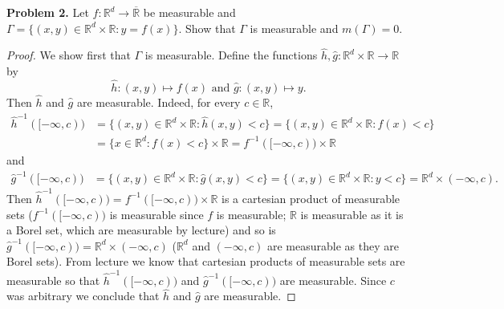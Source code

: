 \noindent \textbf{Problem 2.} Let \( f : \mathbb{R}^{d}  \to \overline{\mathbb{R}} \) be measurable and \( \Gamma = \{ (x,y) \in \mathbb{R}^{d} \times \mathbb{R} : y = f(x) \}  \). Show that \( \Gamma \) is measurable and \( m(\Gamma) = 0 \).
\begin{proof}
	We show first that \( \Gamma \) is measurable. Define the functions \( \hat{h}, \hat{g}  : \mathbb{R}^{d}  \times \mathbb{R} \to \mathbb{R} \) by \[\hat{h} : (x, y) \mapsto f(x) \mbox{ and } \hat{g} : (x,y) \mapsto y. \] Then \( \hat{h}  \) and \( \hat{g}  \) are measurable. Indeed, for every \( c \in \mathbb{R} \),
\begin{align*}
	\hat{h} ^{-1} ([-\infty, c)) &= \{ (x, y) \in \mathbb{R}^{d} \times \mathbb{R} : \hat{h} (x,y) < c \} = \{ (x,y) \in \mathbb{R}^{d} \times \mathbb{R} : f(x) < c \}\\ 
				     &= \{ x \in \mathbb{R}^{d} : f(x) < c \} \times \mathbb{R} = f ^{-1} ([-\infty,c)) \times \mathbb{R}
\end{align*}
and
\begin{align*}
	\hat{g} ^{-1} ([-\infty,c)) &= \{ (x,y) \in \mathbb{R}^{d} \times \mathbb{R} : \hat{g} (x,y) < c \} = \{ (x,y) \in \mathbb{R}^{d}  \times \mathbb{R} : y < c \} = \mathbb{R}^{d} \times (-\infty,c).
\end{align*}
Then \( \hat{h} ^{-1} ([-\infty,c))  = f ^{-1} ([-\infty,c)) \times \mathbb{R} \) is a cartesian product of measurable sets (\( f ^{-1} ([-\infty,c))  \) is measurable since \( f \) is measurable; \( \mathbb{R} \) is measurable as it is a Borel set, which are measurable by lecture) and so is \( \hat{g} ^{-1} ([-\infty,c)) = \mathbb{R}^{d}  \times (-\infty, c) \) (\( \mathbb{R}^{d}  \) and \( (-\infty,c) \) are measurable as they are Borel sets). From lecture we know that cartesian products of measurable sets are measurable so that \( \hat{h} ^{-1} ([-\infty,c))  \) and \( \hat{g} ^{-1} ([-\infty,c))  \) are measurable. Since \( c \) was arbitrary we conclude that \( \hat{h}  \) and \( \hat{g}  \) are measurable.


\end{proof}
